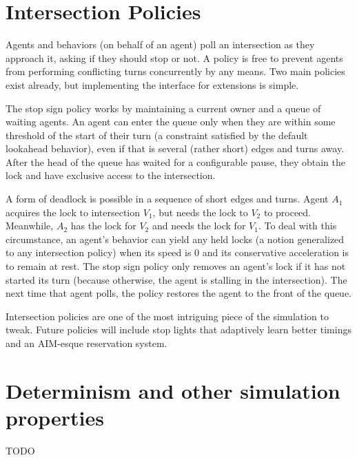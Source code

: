 \documentclass[letterpaper, 10 pt, conference]{ieeeconf}  %
\begin{document}
\section{Intersection Policies}

Agents and behaviors (on behalf of an agent) poll an intersection as they
approach it, asking if they should stop or not. A policy is free to prevent
agents from performing conflicting turns concurrently by any means. Two main
policies exist already, but implementing the interface for extensions is simple.

The stop sign policy works by maintaining a current owner and a queue of waiting
agents. An agent can enter the queue only when they are within some threshold of
the start of their turn (a constraint satisfied by the default lookahead
behavior), even if that is several (rather short) edges and turns away. After
the head of the queue has waited for a configurable pause, they obtain the lock
and have exclusive access to the intersection.

A form of deadlock is possible in a sequence of short edges and turns. Agent
$A_1$ acquires the lock to intersection $V_1$, but needs the lock to $V_2$ to
proceed. Meanwhile, $A_2$ has the lock for $V_2$ and needs the lock for $V_1$.
To deal with this circumstance, an agent's behavior can yield any held locks (a
notion generalized to any intersection policy) when its speed is $0$ and its
conservative acceleration is to remain at rest. The stop sign policy only
removes an agent's lock if it has not started its turn (because otherwise, the
agent is stalling in the intersection). The next time that agent polls, the
policy restores the agent to the front of the queue.


Intersection policies are one of the most intriguing piece of the simulation to
tweak. Future policies will include stop lights that adaptively learn better
timings and an AIM-esque reservation system.

\section{Determinism and other simulation properties}

TODO

\end{document}
